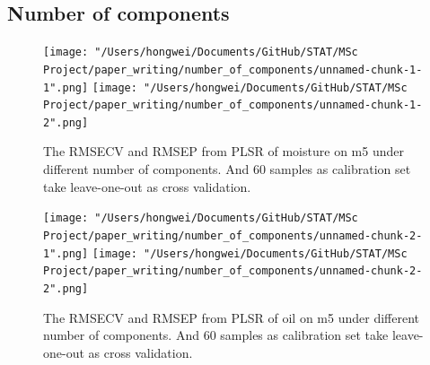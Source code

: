 \documentclass[a4paper,12pt,titlepage]{article} %
\numberwithin{equation}{section}  %
\begin{document}
\begin{appendices}
		
		
		
		
		
		\clearpage
		\section{Number of components}
		\label{app:Number_of_components}
				
	\begin{figure}[h]    %
		\centering           %
		\texttt{[image: "/Users/hongwei/Documents/GitHub/STAT/MSc Project/paper\_writing/number\_of\_components/unnamed-chunk-1-1".png]}  %
		\texttt{[image: "/Users/hongwei/Documents/GitHub/STAT/MSc Project/paper\_writing/number\_of\_components/unnamed-chunk-1-2".png]}  %
		\caption{The RMSECV and RMSEP from PLSR of moisture on m5 under different number of components. And 60 samples as calibration set take leave-one-out as cross validation.}          %
		\label{fig:components_1-1}               %
	\end{figure}                        %
	
	\begin{figure}[h]    %
		\centering           %
		\texttt{[image: "/Users/hongwei/Documents/GitHub/STAT/MSc Project/paper\_writing/number\_of\_components/unnamed-chunk-2-1".png]}  %
		\texttt{[image: "/Users/hongwei/Documents/GitHub/STAT/MSc Project/paper\_writing/number\_of\_components/unnamed-chunk-2-2".png]}  %
		\caption{The RMSECV and RMSEP from PLSR of oil on m5 under different number of components. And 60 samples as calibration set take leave-one-out as cross validation.}          %
		\label{fig:components_2-1}               %
	\end{figure}                        %
	

\end{appendices}
\end{document}
